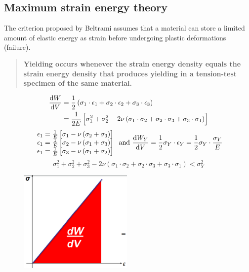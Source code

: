 \documentclass[class=report, crop=false, 12pt,a4paper]{standalone}
\begin{document}
\subsection{Maximum strain energy theory}
The criterion proposed by Beltrami assumes that a material can store a limited amount of elastic energy as strain before undergoing plastic deformations (failure).
\begin{quotation}
  \textbf{Yielding occurs whenever the strain energy density equals the strain energy density that produces yielding in a tension-test specimen of the same material.}
\end{quotation}
\begin{align}
  \frac{\dif W}{\dif V} &= \frac{1}{2} \left( \sigma_1 \cdot \epsilon_1 + \sigma_2 \cdot \epsilon_2 + \sigma_3 \cdot \epsilon_3 \right)\\
  &= \frac{1}{2E} \left[ \sigma_1^2 + \sigma_2^2 - 2\nu\left(\sigma_1 \cdot \sigma_2 + \sigma_2 \cdot \sigma_3 + \sigma_3 \cdot \sigma_1 \right) \right]
\end{align}
\begin{equation}
  \begin{array}{l}
    \epsilon_1 = \frac{1}{E} \left[\sigma_1 - \nu \left(\sigma_2 + \sigma_3\right)\right]\\
    \epsilon_1 = \frac{1}{E} \left[\sigma_2 - \nu \left(\sigma_1 + \sigma_3\right)\right]\\
    \epsilon_1 = \frac{1}{E} \left[\sigma_3 - \nu \left(\sigma_1 + \sigma_2\right)\right]
  \end{array} \textrm{ and } \frac{\dif W_Y}{\dif V} = \frac{1}{2} \sigma_Y \cdot \epsilon_Y = \frac{1}{2}\sigma_Y \cdot \frac{\sigma_Y}{E}
\end{equation}
\begin{equation}
  \sigma_1^2 + \sigma_2^2 + \sigma_3^2 - 2\nu \left(\sigma_1 \cdot \sigma_2 + \sigma_2 \cdot \sigma_3 + \sigma_3 \cdot \sigma_1 \right) < \sigma_Y^2
\end{equation}
\begin{figure}[H]
  \centering
  \includegraphics[height = 5cm]{../img/diagram28.png}
  \caption{}
\end{figure}
\end{document}
